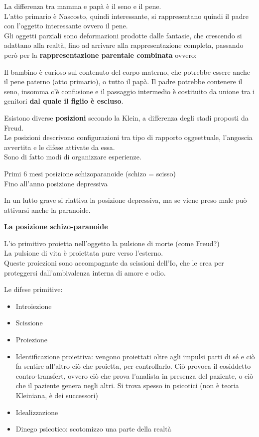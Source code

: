 \documentclass[
]{article}
\providecommand{\tightlist}{%
  \setlength{\itemsep}{0pt}\setlength{\parskip}{0pt}}
\begin{document}
La differenza tra mamma e papà è il seno e il pene.\\
L'atto primario è Nascosto, quindi interessante, si rappresentano quindi
il padre con l'oggetto interessante ovvero il pene.\\
Gli oggetti parziali sono deformazioni prodotte dalle fantasie, che
crescendo si adattano alla realtà, fino ad arrivare alla
rappresentazione completa, passando però per la \textbf{rappresentazione
parentale combinata} ovvero:

Il bambino è curioso sul contenuto del corpo materno, che potrebbe
essere anche il pene paterno (atto primario), o tutto il papà. Il padre
potrebbe contenere il seno, insomma c'è confusione e il passaggio
intermedio è costituito da unione tra i genitori \textbf{dal quale il
figlio è escluso}.

Esistono diverse \textbf{posizioni} secondo la Klein, a differenza degli
stadi proposti da Freud.\\
Le posizioni descrivono configurazioni tra tipo di rapporto oggeettuale,
l'angoscia avvertita e le difese attivate da essa.\\
Sono di fatto modi di organizzare esperienze.

Primi 6 mesi posizione schizoparanoide (schizo = scisso)\\
Fino all'anno posizione depressiva

In un lutto grave si riattiva la posizione depressiva, ma se viene preso
male può attivarsi anche la paranoide.

\textbf{La posizione schizo-paranoide}

L'io primitivo proietta nell'oggetto la pulsione di morte (come
Freud?)\\
La pulsione di vita è proiettata pure verso l'esterno.\\
Queste proiezioni sono accompagnate da scissioni dell'Io, che le crea
per proteggersi dall'ambivalenza interna di amore e odio.

Le difese primitive:

\begin{itemize}
\tightlist
\item
  Introiezione
\item
  Scissione
\item
  Proiezione
\item
  Identificazione proiettiva: vengono proiettati oltre agli impulsi
  parti di sé e ciò fa sentire all'altro ciò che proietta, per
  controllarlo. Ciò provoca il cosiddetto contro-transfert, ovvero ciò
  che prova l'analista in presenza del paziente, o ciò che il paziente
  genera negli altri. Si trova spesso in psicotici (non è teoria
  Kleiniana, è dei successori)\\
\item
  Idealizzazione
\item
  Dinego psicotico: scotomizzo una parte della realtà
\end{itemize}
\end{document}
